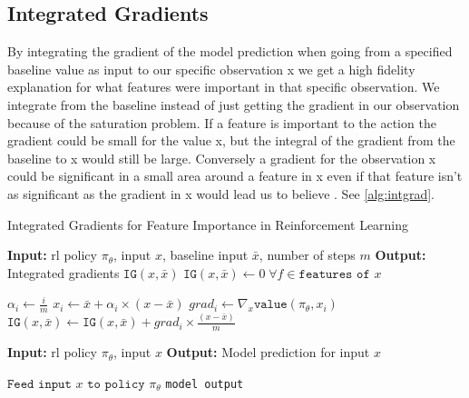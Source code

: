 \documentclass[UKenglish]{uiomasterthesis}
\begin{document}
\subsection{Integrated Gradients}
\label{sec:intgrad}
By integrating the gradient of the model prediction when going from a specified baseline value as input to our specific observation x we get a high fidelity explanation for what features were important in that specific observation. We integrate from the baseline instead of just getting the gradient in our observation because of the saturation problem. If a feature is important to the action the gradient could be small for the value x, but the integral of the gradient from the baseline to x would still be large. Conversely a gradient for the observation x could be significant in a small area around a feature in x even if that feature isn't as significant as the gradient in x would lead us to believe \cite{sundararajan2017axiomaticattributiondeepnetworks}. See \cref{alg:intgrad}. 

\begin{algorithm}
\caption{Integrated Gradients for Feature Importance in Reinforcement Learning}
\label{alg:intgrad}
\begin{algorithmic}
    \State \textbf{Input:} \ac{rl} policy $\pi_\theta$, input $x$, baseline input $\bar{x}$, number of steps $m$
    \State \textbf{Output:} Integrated gradients $\texttt{IG}(x, \bar{x})$
    \State $\texttt{IG}(x, \bar{x}) \gets 0 \; \forall f \in \texttt{features of } x$ 
    
        \State $\alpha_i \gets \frac{i}{m}$
        \State $x_i \gets \bar{x} + \alpha_i \times (x - \bar{x})$
        \State $grad_i \gets \nabla_x \texttt{value}(\pi_\theta, x_i)$ 
        \State $\texttt{IG}(x, \bar{x}) \gets \texttt{IG}(x, \bar{x}) + grad_i \times \frac{(x - \bar{x})}{m}$
    \EndFor
    
        \State \textbf{Input:} \ac{rl} policy $\pi_\theta$, input $x$
        \State \textbf{Output:} Model prediction for input $x$
        
        \State $\texttt{Feed input } x \texttt{ to policy } \pi_\theta$
        \State \Return \texttt{model output}
    \EndFunction
\end{algorithmic}
\end{algorithm}
\end{document}
